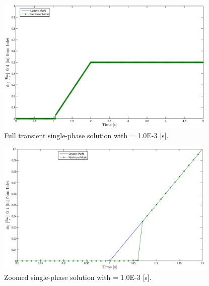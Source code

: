 
\begin{figure}[h!t]
\centering
\includegraphics[width=0.94\textwidth]{images/single_1em3.eps}
\caption{Full transient single-phase solution with \dtmax{} = 1.0E-3 {[s]}.}
\label{fig:single_1em3}
\end{figure}

\begin{figure}[h!t]
\centering
\includegraphics[width=0.94\textwidth]{images/single_1em3_zoom.eps}
\caption{Zoomed single-phase solution with \dtmax{} = 1.0E-3 {[s]}.}
\label{fig:single_1em3_zoom}
\end{figure}

